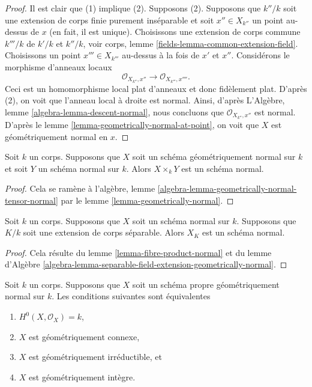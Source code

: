 \begin{proof}
Il est clair que (1) implique (2). Supposons (2). Supposons que
$k''/k$ soit une extension de corps finie purement inséparable et
soit $x'' \in X_{k''}$ un point au-dessus de $x$ (en fait, il
est unique). Choisissons une extension de corps commune $k'''/k$ de
$k'/k$ et $k''/k$, voir corps, lemme
\ref{fields-lemma-common-extension-field}. Choisissons un point $x''' \in X_{k'''}$
au-dessus à la fois de $x'$ et $x''$. Considérons le morphisme d'anneaux locaux
$$
\mathcal{O}_{X_{k''}, x''} \longrightarrow \mathcal{O}_{X_{k'''}, x''''}.
$$
Ceci est un homomorphisme local plat d'anneaux et donc
fidèlement plat. D'après (2), on voit que l'anneau local à
droite est normal. Ainsi, d'après L'Algèbre, lemme
\ref{algebra-lemma-descent-normal}, nous concluons que
$\mathcal{O}_{X_{k''}, x''}$ est normal. D'après le lemme
\ref{lemma-geometrically-normal-at-point}, on voit que $X$ est géométriquement normal en $x$.
\end{proof}

\begin{lemma}
\label{lemma-fibre-product-normal}
Soit $k$ un corps. Supposons que $X$ soit un
schéma géométriquement normal sur $k$ et soit $Y$ un schéma
normal sur $k$. Alors $X \times_k Y$ est un schéma normal.
\end{lemma}

\begin{proof}
Cela se ramène à l'algèbre, lemme
\ref{algebra-lemma-geometrically-normal-tensor-normal}
par le lemme
\ref{lemma-geometrically-normal}.
\end{proof}

\begin{lemma}
\label{lemma-base-change-normal-by-separable}
Soit $k$ un corps. Supposons que $X$ soit un schéma normal sur $k$.
Supposons que $K/k$ soit une extension de corps séparable. Alors $X_K$ est un schéma normal.
\end{lemma}

\begin{proof}
Cela résulte du lemme
\ref{lemma-fibre-product-normal} et du lemme d'Algèbre
\ref{algebra-lemma-separable-field-extension-geometrically-normal}.
\end{proof}

\begin{lemma}
\label{lemma-geometrically-normal-stein}
Soit $k$ un corps. Supposons que $X$ soit un schéma propre
géométriquement normal sur $k$. Les conditions suivantes sont équivalentes
\begin{enumerate}
\item $H^0(X, \mathcal{O}_X) = k$, \item
$X$ est géométriquement connexe, \item
$X$ est géométriquement irréductible, et
\item $X$ est géométriquement intègre.
\end{enumerate}
\end{lemma}

